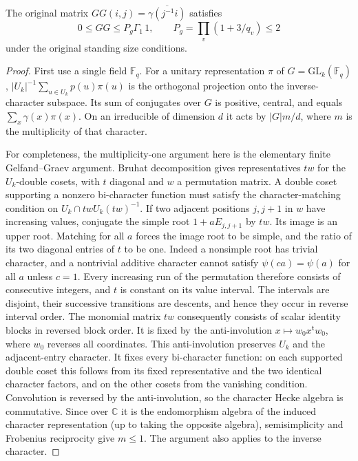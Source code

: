 \begin{lemma}
\label{lem:flag-finite-levi-gram}
The original matrix \(GG(i,j)=\overline{\gamma(j^{-1}i)}\) satisfies
\[
 0\le GG\le P_g\Gamma_1\,1,\qquad
 P_g=\prod_v(1+3/q_v)\le2
 \tag{FL2}
\]
under the original standing size conditions.
\end{lemma}
\begin{proof}
First use a single field \(\mathbb F_q\). For a unitary
representation \(\pi\) of \(G=\mathrm{GL}_k(\mathbb F_q)\),
\(|U_k|^{-1}\sum_{u\in U_k}p(u)\pi(u)\) is the orthogonal
projection onto the inverse-character subspace. Its sum of
conjugates over \(G\) is positive, central, and equals
\(\sum_x\gamma(x)\pi(x)\). On an irreducible of dimension \(d\)
it acts by \(|G|m/d\), where \(m\) is the multiplicity of
that character.

For completeness, the multiplicity-one argument here is the
elementary finite Gelfand--Graev argument. Bruhat decomposition
gives representatives \(tw\) for the \(U_k\)-double cosets, with
\(t\) diagonal and \(w\) a permutation matrix. A double coset
supporting a nonzero bi-character function must satisfy the
character-matching condition on \(U_k\cap twU_k(tw)^{-1}\).
If two adjacent positions \(j,j+1\) in \(w\) have increasing
values, conjugate the simple root \(1+aE_{j,j+1}\) by \(tw\).
Its image is an upper root. Matching for all \(a\) forces
the image root to be simple, and the ratio of its two diagonal
entries of \(t\) to be one. Indeed a nonsimple root has trivial
character, and a nontrivial additive character cannot satisfy
\(\psi(ca)=\psi(a)\) for all \(a\) unless \(c=1\).
Every increasing run of the permutation therefore consists of
consecutive integers, and \(t\) is constant on its value interval.
The intervals are disjoint, their successive transitions are
descents, and hence they occur in reverse interval order.
The monomial matrix \(tw\) consequently consists of scalar identity
blocks in reversed block order. It is fixed by the anti-involution
\(x\mapsto w_0 x^{\mathsf t} w_0\), where \(w_0\) reverses all
coordinates. This anti-involution preserves \(U_k\) and the
adjacent-entry character. It fixes every bi-character function:
on each supported double coset this follows from its fixed
representative and the two identical character factors, and on
the other cosets from the vanishing condition. Convolution is
reversed by the anti-involution, so the character Hecke algebra
is commutative. Since over \(\mathbb C\) it is the endomorphism
algebra of the induced character representation (up to taking the
opposite algebra), semisimplicity and Frobenius reciprocity give
\(m\le1\). The argument also applies to the inverse character.


\end{proof}
